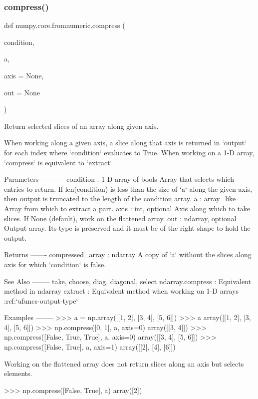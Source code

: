  \mbox{\label{namespacenumpy_1_1core_1_1fromnumeric_a3f38b7c769becaa0407b6f02203f1bc0}} 
\subsubsection{\texorpdfstring{compress()}{compress()}}
{\footnotesize\ttfamily def numpy.\+core.\+fromnumeric.\+compress (\begin{DoxyParamCaption}\item[{}]{condition,  }\item[{}]{a,  }\item[{}]{axis = {\ttfamily None},  }\item[{}]{out = {\ttfamily None} }\end{DoxyParamCaption})}

\begin{DoxyVerb}Return selected slices of an array along given axis.

When working along a given axis, a slice along that axis is returned in
`output` for each index where `condition` evaluates to True. When
working on a 1-D array, `compress` is equivalent to `extract`.

Parameters
----------
condition : 1-D array of bools
    Array that selects which entries to return. If len(condition)
    is less than the size of `a` along the given axis, then output is
    truncated to the length of the condition array.
a : array_like
    Array from which to extract a part.
axis : int, optional
    Axis along which to take slices. If None (default), work on the
    flattened array.
out : ndarray, optional
    Output array.  Its type is preserved and it must be of the right
    shape to hold the output.

Returns
-------
compressed_array : ndarray
    A copy of `a` without the slices along axis for which `condition`
    is false.

See Also
--------
take, choose, diag, diagonal, select
ndarray.compress : Equivalent method in ndarray
extract : Equivalent method when working on 1-D arrays
:ref:`ufuncs-output-type`

Examples
--------
>>> a = np.array([[1, 2], [3, 4], [5, 6]])
>>> a
array([[1, 2],
       [3, 4],
       [5, 6]])
>>> np.compress([0, 1], a, axis=0)
array([[3, 4]])
>>> np.compress([False, True, True], a, axis=0)
array([[3, 4],
       [5, 6]])
>>> np.compress([False, True], a, axis=1)
array([[2],
       [4],
       [6]])

Working on the flattened array does not return slices along an axis but
selects elements.

>>> np.compress([False, True], a)
array([2])\end{DoxyVerb}
 \mbox{\label{namespacenumpy_1_1core_1_1fromnumeric_af121d8f5a4195e1a932089450235c8a2}} 
